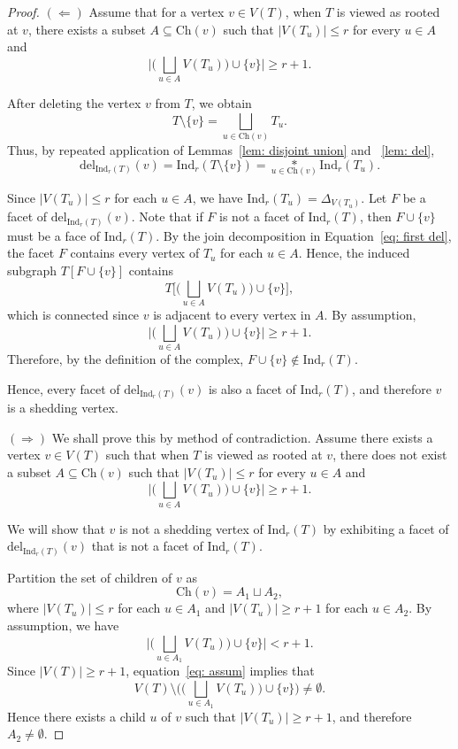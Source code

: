 \documentclass[12pt,reqno]{amsart}
\theoremstyle{definition}
\def\Ind{\mathrm{Ind}}
\def\del{\mathrm{del}}
\begin{document}
\begin{proof}
$(\Leftarrow)$ Assume that for a vertex $v \in V(T)$, when $T$ is viewed as rooted at $v$, there exists a subset $A \subseteq \mathrm{Ch}(v)$ such that $|V(T_u)| \le r$ for every $u \in A$ and 
\[
\Big|\Big(\bigsqcup_{u \in A} V(T_u)\Big) \cup \{v\}\Big| \ge r+1.
\]

After deleting the vertex $v$ from $T$, we obtain
\[
T \setminus \{v\}
=
\bigsqcup_{u \in \mathrm{Ch}(v)} T_u.
\]
Thus, by repeated application of Lemmas~\ref{lem: disjoint union} and ~\ref{lem: del},
\begin{equation}\label{eq: first del}
\del_{\Ind_r(T)}(v)
=
\Ind_r(T \setminus \{v\})
=
\underset{u \in \mathrm{Ch}(v)}{*} \Ind_r(T_u).
\end{equation}

Since $|V(T_u)| \le r$ for each $u \in A$, we have $\Ind_r(T_u) = \Delta_{V(T_u)}$. Let $F$ be a facet of $\del_{\Ind_r(T)}(v)$. Note that if $F$ is not a facet of $\Ind_r(T)$, then $F \cup \{v\}$ must be a face of $\Ind_r(T)$. By the join decomposition in Equation~\eqref{eq: first del}, the facet $F$ contains every vertex of $T_u$ for each $u \in A$. Hence, the induced subgraph $T[F \cup \{v\}]$ contains
\[
T\Big[\Big(\bigsqcup_{u \in A} V(T_u)\Big) \cup \{v\}\Big],
\]
which is connected since $v$ is adjacent to every vertex in $A$. By assumption,
\[
\Big|\Big(\bigsqcup_{u \in A} V(T_u)\Big) \cup \{v\}\Big| \ge r+1.
\]
Therefore, by the definition of the complex, $F \cup \{v\} \notin \Ind_r(T)$.

Hence, every facet of $\del_{\Ind_r(T)}(v)$ is also a facet of $\Ind_r(T)$, and therefore $v$ is a shedding vertex.

\medskip
\noindent
$(\Rightarrow)$ We shall prove this by method of contradiction. Assume there exists a vertex $v \in V(T)$ such that when $T$ is viewed as rooted at $v$, there does not exist a subset $A \subseteq \mathrm{Ch}(v)$ such that $|V(T_u)| \le r$ for every $u \in A$ and 
\[
\Big|\Big(\bigsqcup_{u \in A} V(T_u)\Big) \cup \{v\}\Big| \ge r+1.
\]

We will show that $v$ is not a shedding vertex of $\Ind_r(T)$ by exhibiting a facet of $\del_{\Ind_r(T)}(v)$ that is not a facet of $\Ind_r(T)$.

Partition the set of children of $v$ as
\[
\mathrm{Ch}(v) = A_1 \sqcup A_2,
\]
where $|V(T_u)| \le r$ for each $u \in A_1$ and $|V(T_u)| \ge r+1$ for each $u \in A_2$. By assumption, we have
\begin{equation}\label{eq: assum}
\Big|\Big(\bigsqcup_{u \in A_1} V(T_u)\Big) \cup \{v\}\Big| < r+1.
\end{equation}
Since $|V(T)| \ge r+1$, equation~\eqref{eq: assum} implies that
\[
V(T)\setminus \Big(\Big(\bigsqcup_{u \in A_1} V(T_u)\Big)\cup \{v\}\Big)\neq \emptyset.
\]
Hence there exists a child $u$ of $v$ such that $|V(T_u)| \ge r+1$, and therefore $A_2 \neq \emptyset$.


\end{proof}
\end{document}
